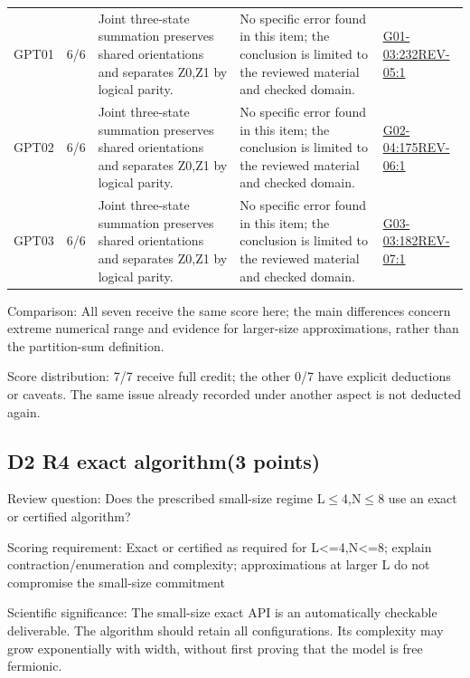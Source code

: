 \documentclass[11pt,a4paper]{article}
\begin{document}
{\begin{longtable}
{}GPT01 & 6/\allowbreak{}6 & Joint three-state summation preserves shared orientations and separates Z0,\allowbreak{}Z1 by logical parity. & No specific error found in this item; the conclusion is limited to the reviewed material and checked domain. & \hyperref[src:G01-03]{G01-03:232}\newline \hyperref[src:REV-05]{REV-05:1}\tabularnewline
{}GPT02 & 6/\allowbreak{}6 & Joint three-state summation preserves shared orientations and separates Z0,\allowbreak{}Z1 by logical parity. & No specific error found in this item; the conclusion is limited to the reviewed material and checked domain. & \hyperref[src:G02-04]{G02-04:175}\newline \hyperref[src:REV-06]{REV-06:1}\tabularnewline
{}GPT03 & 6/\allowbreak{}6 & Joint three-state summation preserves shared orientations and separates Z0,\allowbreak{}Z1 by logical parity. & No specific error found in this item; the conclusion is limited to the reviewed material and checked domain. & \hyperref[src:G03-03]{G03-03:182}\newline \hyperref[src:REV-07]{REV-07:1}\tabularnewline
\bottomrule
\end{longtable}
}
Comparison: All seven receive the same score here; the main differences concern extreme numerical range and evidence for larger-size approximations,\allowbreak{} rather than the partition-sum definition.

Score distribution: 7/\allowbreak{}7 receive full credit; the other 0/\allowbreak{}7 have explicit deductions or caveats. The same issue already recorded under another aspect is not deducted again.

\clearpage
\subsection{D2 R4 exact algorithm(3 points)}
\label{aspect:D2}
Review question: Does the prescribed small-size regime L\ensuremath{\leq}4,\allowbreak{}N\ensuremath{\leq}8 use an exact or certified algorithm?

Scoring requirement: Exact or certified as required for L<=4,\allowbreak{}N<=8; explain contraction/\allowbreak{}enumeration and complexity; approximations at larger L do not compromise the small-size commitment

Scientific significance: The small-size exact API is an automatically checkable deliverable. The algorithm should retain all configurations. Its complexity may grow exponentially with width,\allowbreak{} without first proving that the model is free fermionic.
\end{document}
